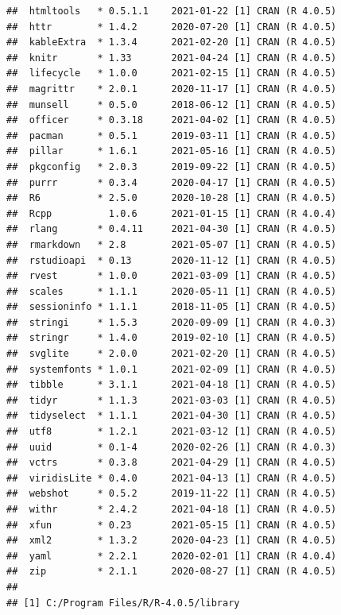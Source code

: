 \documentclass[
  11pt,
]{article}
\begin{document}
\begin{verbatim}
##  htmltools   * 0.5.1.1    2021-01-22 [1] CRAN (R 4.0.5)                   
##  httr        * 1.4.2      2020-07-20 [1] CRAN (R 4.0.5)                   
##  kableExtra  * 1.3.4      2021-02-20 [1] CRAN (R 4.0.5)                   
##  knitr       * 1.33       2021-04-24 [1] CRAN (R 4.0.5)                   
##  lifecycle   * 1.0.0      2021-02-15 [1] CRAN (R 4.0.5)                   
##  magrittr    * 2.0.1      2020-11-17 [1] CRAN (R 4.0.5)                   
##  munsell     * 0.5.0      2018-06-12 [1] CRAN (R 4.0.5)                   
##  officer     * 0.3.18     2021-04-02 [1] CRAN (R 4.0.5)                   
##  pacman      * 0.5.1      2019-03-11 [1] CRAN (R 4.0.5)                   
##  pillar      * 1.6.1      2021-05-16 [1] CRAN (R 4.0.5)                   
##  pkgconfig   * 2.0.3      2019-09-22 [1] CRAN (R 4.0.5)                   
##  purrr       * 0.3.4      2020-04-17 [1] CRAN (R 4.0.5)                   
##  R6          * 2.5.0      2020-10-28 [1] CRAN (R 4.0.5)                   
##  Rcpp          1.0.6      2021-01-15 [1] CRAN (R 4.0.4)                   
##  rlang       * 0.4.11     2021-04-30 [1] CRAN (R 4.0.5)                   
##  rmarkdown   * 2.8        2021-05-07 [1] CRAN (R 4.0.5)                   
##  rstudioapi  * 0.13       2020-11-12 [1] CRAN (R 4.0.5)                   
##  rvest       * 1.0.0      2021-03-09 [1] CRAN (R 4.0.5)                   
##  scales      * 1.1.1      2020-05-11 [1] CRAN (R 4.0.5)                   
##  sessioninfo * 1.1.1      2018-11-05 [1] CRAN (R 4.0.5)                   
##  stringi     * 1.5.3      2020-09-09 [1] CRAN (R 4.0.3)                   
##  stringr     * 1.4.0      2019-02-10 [1] CRAN (R 4.0.5)                   
##  svglite     * 2.0.0      2021-02-20 [1] CRAN (R 4.0.5)                   
##  systemfonts * 1.0.1      2021-02-09 [1] CRAN (R 4.0.5)                   
##  tibble      * 3.1.1      2021-04-18 [1] CRAN (R 4.0.5)                   
##  tidyr       * 1.1.3      2021-03-03 [1] CRAN (R 4.0.5)                   
##  tidyselect  * 1.1.1      2021-04-30 [1] CRAN (R 4.0.5)                   
##  utf8        * 1.2.1      2021-03-12 [1] CRAN (R 4.0.5)                   
##  uuid        * 0.1-4      2020-02-26 [1] CRAN (R 4.0.3)                   
##  vctrs       * 0.3.8      2021-04-29 [1] CRAN (R 4.0.5)                   
##  viridisLite * 0.4.0      2021-04-13 [1] CRAN (R 4.0.5)                   
##  webshot     * 0.5.2      2019-11-22 [1] CRAN (R 4.0.5)                   
##  withr       * 2.4.2      2021-04-18 [1] CRAN (R 4.0.5)                   
##  xfun        * 0.23       2021-05-15 [1] CRAN (R 4.0.5)                   
##  xml2        * 1.3.2      2020-04-23 [1] CRAN (R 4.0.5)                   
##  yaml        * 2.2.1      2020-02-01 [1] CRAN (R 4.0.4)                   
##  zip         * 2.1.1      2020-08-27 [1] CRAN (R 4.0.5)                   
## 
## [1] C:/Program Files/R/R-4.0.5/library
\end{verbatim}
\end{document}
